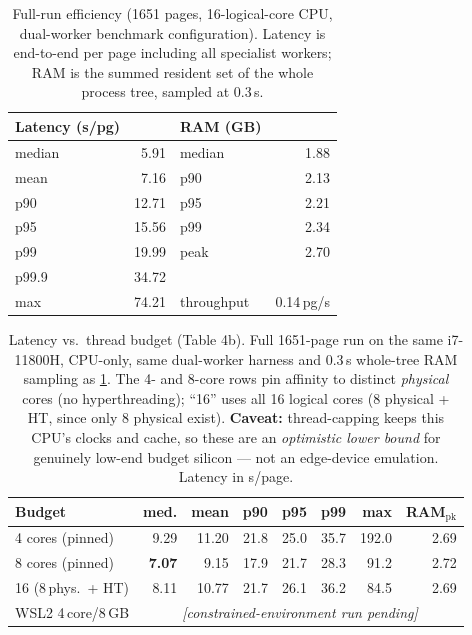 \begin{table}[t]
\centering
\caption{Full-run efficiency (1651 pages, 16-logical-core CPU, dual-worker benchmark configuration). Latency is end-to-end per page including all specialist workers; RAM is the summed resident set of the whole process tree, sampled at 0.3\,s.}
\label{tab:perf}
\small
\setlength{\tabcolsep}{5pt}
\begin{tabular}{lrlr}
\toprule
Latency (s/pg) & & RAM (GB) & \\
\midrule
median & 5.91 & median & 1.88 \\
mean & 7.16 & p90 & 2.13 \\
p90 & 12.71 & p95 & 2.21 \\
p95 & 15.56 & p99 & 2.34 \\
p99 & 19.99 & peak & 2.70 \\
p99.9 & 34.72 & & \\
max & 74.21 & throughput & 0.14\,pg/s \\
\bottomrule
\end{tabular}
\end{table}

\begin{table}[t]
\centering
\caption{Latency vs.\ thread budget (Table 4b). Full 1651-page run on the same i7-11800H, CPU-only, same dual-worker harness and 0.3\,s whole-tree RAM sampling as \cref{tab:perf}. The 4- and 8-core rows pin affinity to distinct \emph{physical} cores (no hyperthreading); ``16'' uses all 16 logical cores (8 physical + HT, since only 8 physical exist). \textbf{Caveat:} thread-capping keeps this CPU's clocks and cache, so these are an \emph{optimistic lower bound} for genuinely low-end budget silicon --- not an edge-device emulation. Latency in s/page.}
\label{tab:perf_threads}
\small
\setlength{\tabcolsep}{4pt}
\begin{tabular}{lrrrrrrr}
\toprule
Budget & med. & mean & p90 & p95 & p99 & max & RAM$_{\text{pk}}$ \\
\midrule
4 cores (pinned)      & 9.29 & 11.20 & 21.8 & 25.0 & 35.7 & 192.0 & 2.69 \\
8 cores (pinned)      & \textbf{7.07} & 9.15 & 17.9 & 21.7 & 28.3 & 91.2 & 2.72 \\
16 (8\,phys.\ + HT)   & 8.11 & 10.77 & 21.7 & 26.1 & 36.2 & 84.5 & 2.69 \\
\midrule
WSL2 4\,core/8\,GB    & \multicolumn{7}{c}{\emph{[constrained-environment run pending]}} \\
\bottomrule
\end{tabular}
\end{table}

